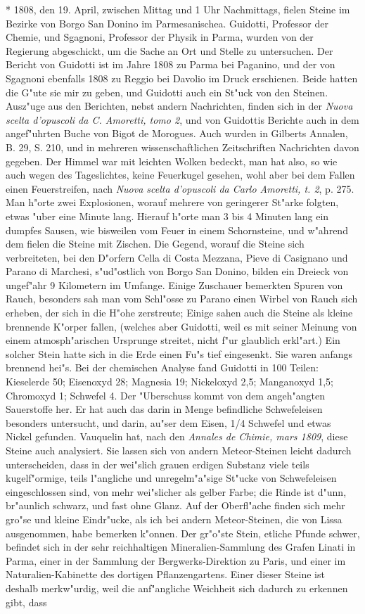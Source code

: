 \documentclass[a4paper, 11pt, oneside, polutonikogreek, german]{article}
\begin{document}
* 1808, den 19. April, zwischen Mittag und 1 Uhr Nachmittags, fielen Steine im Bezirke von Borgo San Donino im Parmesanischea. Guidotti, Professor der Chemie, und Sgagnoni, Professor der Physik in Parma, wurden von der Regierung abgeschickt, um die Sache an Ort und Stelle zu untersuchen. Der Bericht von Guidotti ist im Jahre 1808 zu Parma bei Paganino, und der von Sgagnoni ebenfalls 1808 zu Reggio bei Davolio im Druck erschienen. Beide hatten die G"ute sie mir zu geben, und Guidotti auch ein St"uck von den Steinen. Ausz"uge aus den Berichten, nebst andern Nachrichten, finden sich in der \emph{Nuova scelta d'opuscoli da C. Amoretti, tomo 2}, und von Guidottis Berichte auch in dem angef"uhrten Buche von Bigot de Morogues. Auch wurden in Gilberts Annalen, B. 29, S. 210, und in mehreren wissenschaftlichen Zeitschriften Nachrichten davon gegeben. Der Himmel war mit leichten Wolken bedeckt, man hat also, so wie auch wegen des Tageslichtes, keine Feuerkugel gesehen, wohl aber bei dem Fallen einen Feuerstreifen, nach \emph{Nuova scelta d'opuscoli da Carlo Amoretti, t. 2}, p. 275. Man h"orte zwei Explosionen, worauf mehrere von geringerer St"arke folgten, etwas "uber eine Minute lang. Hierauf h"orte man 3 bis 4 Minuten lang ein dumpfes Sausen, wie bisweilen vom Feuer in einem Schornsteine, und w"ahrend dem fielen die Steine mit Zischen. Die Gegend, worauf die Steine sich verbreiteten, bei den D"orfern Cella di Costa Mezzana, Pieve di Casignano und Parano di Marchesi, s"ud"ostlich von Borgo San Donino, bilden ein Dreieck von ungef"ahr 9 Kilometern im Umfange. Einige Zuschauer bemerkten Spuren von Rauch, besonders sah man vom Schl"osse zu Parano einen Wirbel von Rauch sich erheben, der sich in die H"ohe zerstreute; Einige sahen auch die Steine als kleine brennende K"orper fallen, (welches aber Guidotti, weil es mit seiner Meinung von einem atmosph"arischen Ursprunge streitet, nicht f"ur glaublich erkl"art.) Ein solcher Stein hatte sich in die Erde einen Fu"s tief eingesenkt. Sie waren anfangs brennend hei"s. Bei der chemischen Analyse fand Guidotti in 100 Teilen: Kieselerde 50; Eisenoxyd 28; Magnesia 19; Nickeloxyd 2,5; Manganoxyd 1,5; Chromoxyd 1; Schwefel 4. Der "Uberschuss kommt von dem angeh"angten Sauerstoffe her. Er hat auch das darin in Menge befindliche Schwefeleisen besonders untersucht, und darin, au"ser dem Eisen, 1/4 Schwefel und etwas Nickel gefunden. Vauquelin hat, nach den \emph{Annales de Chimie, mars 1809}, diese Steine auch analysiert. Sie lassen sich von andern Meteor-Steinen leicht dadurch unterscheiden, dass in der wei"slich grauen erdigen Substanz viele teils kugelf"ormige, teils l"angliche und unregelm"a"sige St"ucke von Schwefeleisen eingeschlossen sind, von mehr wei"slicher als gelber Farbe; die Rinde ist d"unn, br"aunlich schwarz, und fast ohne Glanz. Auf der Oberfl"ache finden sich mehr gro"se und kleine Eindr"ucke, als ich bei andern Meteor-Steinen, die von Lissa ausgenommen, habe bemerken k"onnen. Der gr"o"ste Stein, etliche Pfunde schwer, befindet sich in der sehr reichhaltigen Mineralien-Sammlung des Grafen Linati in Parma, einer in der Sammlung der Bergwerks-Direktion zu Paris, und einer im Naturalien-Kabinette des dortigen Pflanzengartens. Einer dieser Steine ist deshalb merkw"urdig, weil die anf"angliche Weichheit sich dadurch zu erkennen gibt, dass 
\end{document}

